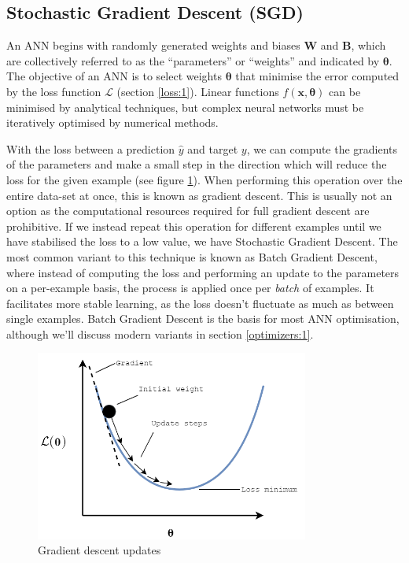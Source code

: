 \documentclass{report}
\begin{document}
	\subsection{Stochastic Gradient Descent (SGD)} \label{sgd:1}
	An ANN begins with randomly generated weights and biases $\bm{W}$ and $\bm{B}$, which are collectively referred to as the ``parameters'' or ``weights'' and indicated by $\bm{\theta}$. The objective of an ANN is to select weights $\bm{\theta}$ that minimise the error computed by the loss function $\mathcal{L}$ (section \ref{loss:1}). Linear functions $f(\bm{x}, \bm{\theta})$ can be minimised by analytical techniques, but complex neural networks must be iteratively optimised by numerical methods. \par
	With the loss between a prediction $\hat{y}$ and target $y$, we can compute the gradients of the parameters and make a small step in the direction which will reduce the loss for the given example (see figure \ref{fig:grad-descent:1}). When performing this operation over the entire data-set at once, this is known as gradient descent. This is usually not an option as the computational resources required for full gradient descent are prohibitive. If we instead repeat this operation for different examples until we have stabilised the loss to a low value, we have Stochastic Gradient Descent. The most common variant to this technique is known as Batch Gradient Descent, where instead of computing the loss and performing an update to the parameters on a per-example basis, the process is applied once per \textit{batch} of examples. It facilitates more stable learning, as the loss doesn't fluctuate as much as between single examples. Batch Gradient Descent is the basis for most ANN optimisation, although we'll discuss modern variants in section \ref{optimizers:1}. \par
		\begin{figure}[h]
		\centering
		\includegraphics[width=9cm]{graddescent}
		\caption{Gradient descent updates}
		\label{fig:grad-descent:1}
	\end{figure}
\end{document}
